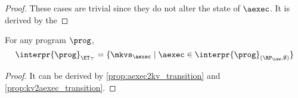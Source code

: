 \begin{proof}
These cases are trivial since they do not alter the state of \( \aexec \).
It is derived by the \ih
\end{proof}

\begin{corollary}
For any program $\prog$, 
\[
\interpr{\prog}_{\ET_{\top}} = \{\mkvs_{\aexec} \mid \aexec \in \interpr{\prog}_{(\RP_{\LWW}, \emptyset)}\}
\]
\end{corollary}
\begin{proof}
    It can be derived by \cref{prop:aexec2kv_transition} and \cref{prop:kv2aexec_transition}.
\end{proof}



